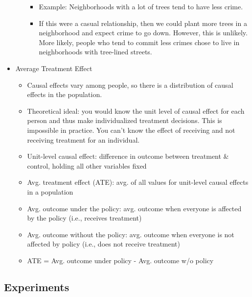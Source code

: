 \documentclass[]{book}
\providecommand{\tightlist}{%
  \setlength{\itemsep}{0pt}\setlength{\parskip}{0pt}}
\begin{document}
\begin{itemize}
\begin{itemize}
    \begin{itemize}
    \tightlist
    \item
      Example: Neighborhoods with a lot of trees tend to have less crime.
    \item
      If this were a casual relationship, then we could plant more trees in a neighborhood and expect crime to go down. However, this is unlikely. More likely, people who tend to commit less crimes chose to live in neighborhoods with tree-lined streets.
    \end{itemize}
  \end{itemize}
\item
  Average Treatment Effect

  \begin{itemize}
  \tightlist
  \item
    Causal effects vary among people, so there is a distribution of causal effects in the population.
  \item
    Theoretical ideal: you would know the unit level of causal effect for each person and thus make individualized treatment decisions. This is impossible in practice. You can't know the effect of receiving and not receiving treatment for an individual.
  \item
    Unit-level causal effect: difference in outcome between treatment \& control, holding all other variables fixed
  \item
    Avg. treatment effect (ATE): avg. of all values for unit-level causal effects in a population
  \item
    Avg. outcome under the policy: avg. outcome when everyone is affected by the policy (i.e., receives treatment)
  \item
    Avg. outcome without the policy: avg. outcome when everyone is not affected by policy (i.e., does not receive treatment)
  \item
    ATE = Avg. outcome under policy - Avg. outcome w/o policy
  \end{itemize}
\end{itemize}

\hypertarget{experiments}{%
\subsection{Experiments}\label{experiments}}
\end{document}
